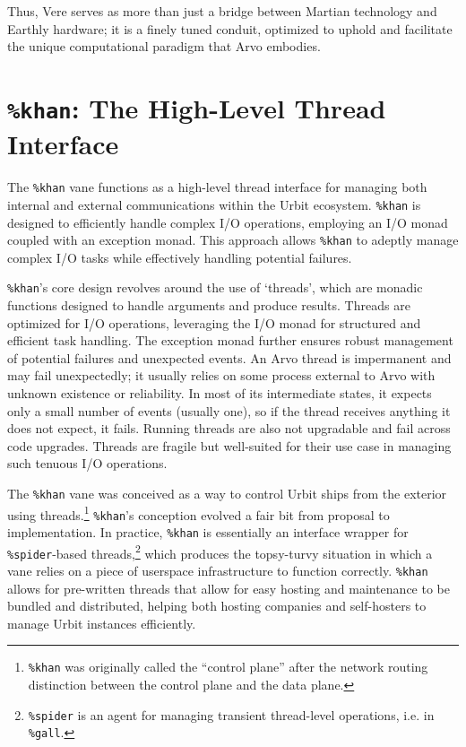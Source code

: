 \documentclass[twoside]{article}
\begin{document}
Thus, Vere serves as more than just a bridge between Martian technology and Earthly hardware; it is a finely tuned conduit, optimized to uphold and facilitate the unique computational paradigm that Arvo embodies.


\section{\texttt{\%khan}:  The High-Level Thread Interface}

The \texttt{\%khan} vane functions as a high-level thread interface for managing both internal and external communications within the Urbit ecosystem.  \texttt{\%khan} is designed to efficiently handle complex I/O operations, employing an I/O monad coupled with an exception monad.  This approach allows \texttt{\%khan} to adeptly manage complex I/O tasks while effectively handling potential failures.

\texttt{\%khan}'s core design revolves around the use of `threads', which are monadic functions designed to handle arguments and produce results.  Threads are optimized for I/O operations, leveraging the I/O monad for structured and efficient task handling.  The exception monad further ensures robust management of potential failures and unexpected events.  An Arvo thread is impermanent and may fail unexpectedly; it usually relies on some process external to Arvo with unknown existence or reliability.  In most of its intermediate states, it expects only a small number of events (usually one), so if the thread receives anything it does not expect, it fails.  Running threads are also not upgradable and fail across code upgrades.  Threads are fragile but well-suited for their use case in managing such tenuous I/O operations.

\sloppy
The \texttt{\%khan} vane was conceived as a way to control Urbit ships from the exterior using threads.\footnote{\texttt{\%khan} was originally called the ``control plane'' after the network routing distinction between the control plane and the data plane.}  \texttt{\%khan}'s conception evolved a fair bit from proposal to implementation.  In practice, \texttt{\%khan} is essentially an interface wrapper for \texttt{\%spider}-based threads,\footnote{\texttt{\%spider} is an agent for managing transient thread-level operations, i.e. in \texttt{\%gall}.} which produces the topsy-turvy situation in which a vane relies on a piece of userspace infrastructure to function correctly.  \texttt{\%khan} allows for pre-written threads that allow for easy hosting and maintenance to be bundled and distributed, helping both hosting companies and self-hosters to manage Urbit instances efficiently. 
\end{document}
